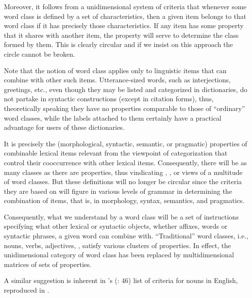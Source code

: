 \documentclass[output=paper]{langsci/langscibook}
\begin{document}
Moreover, it follows from a unidimensional system of criteria that whenever
some word class is defined by a set of characteristics, then a given item
belongs to that word class if it has precisely those characteristics. If any
item has some property that it shares with another item, the property will
serve to determine the class formed by them. This is clearly circular and if we
insist on this approach the circle cannot be broken.

Note that the notion of word class applies only to linguistic items that can
combine with other such items. Utterance-sized words, such as interjections,
greetings, etc., even though they may be listed and categorized in dictionaries, do not partake in syntactic constructions (except
in citation forms), thus, theoretically speaking they have no properties
comparable to those of \enquote{ordinary} word classes, while the labels
attached to them certainly have a practical advantage for users of these
dictionaries.

It is precisely the (morphological, syntactic, semantic, or pragmatic)
properties of combinable lexical items relevant from the viewpoint of
categorization that control their cooccurrence with other lexical items.
Consequently, there will be as many classes as there are properties, thus
vindicating , , or
 views of a multitude of word classes. But these
definitions will no longer be circular since the criteria they are based on
will figure in various levels of grammar in determining the combination of
items, that is, in morphology, syntax, semantics, and pragmatics.

Consequently, what we understand by a word class will be a set of instructions
specifying what other lexical or syntactic objects, whether affixes, words or
syntactic phrases, a given word can combine with. \enquote{Traditional} word
classes, i.e., nouns, verbs, adjectives, , satisfy various clusters of
properties.  In effect, the unidimensional category of word class has been
replaced by multidimensional matrices of sets of properties.

A similar suggestion is inherent in \citeauthor{Crystal1967}’s
(\citeyear{Crystal1967}: 46) list of criteria for
nouns in English, reproduced in .
\end{document}
